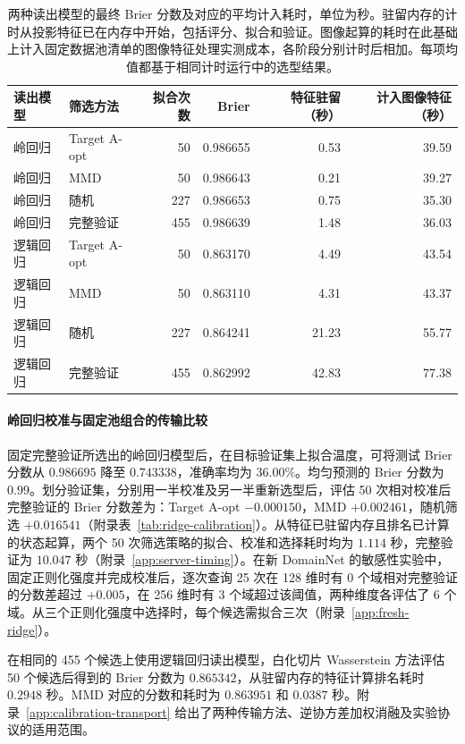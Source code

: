 \documentclass[UTF8,fontset=fandol,scheme=chinese,zihao=false,11pt,letterpaper]{ctexart}
\begin{document}
\begin{table}[ht]
\centering
\caption{两种读出模型的最终 Brier 分数及对应的平均计入耗时，单位为秒。驻留内存的计时从投影特征已在内存中开始，包括评分、拟合和验证。图像起算的耗时在此基础上计入固定数据池清单的图像特征处理实测成本，各阶段分别计时后相加。每项均值都基于相同计时运行中的选型结果。}
\label{tab:cost}
\begin{tabular}{llrrrr}
\toprule
读出模型 & 筛选方法 & 拟合次数 & Brier & 特征驻留（秒） & 计入图像特征（秒）\\
\midrule
岭回归 & Target A-opt & 50 & 0.986655 & 0.53 & 39.59 \\
岭回归 & MMD & 50 & 0.986643 & 0.21 & 39.27 \\
岭回归 & 随机 & 227 & 0.986653 & 0.75 & 35.30 \\
岭回归 & 完整验证 & 455 & 0.986639 & 1.48 & 36.03 \\
逻辑回归 & Target A-opt & 50 & 0.863170 & 4.49 & 43.54 \\
逻辑回归 & MMD & 50 & 0.863110 & 4.31 & 43.37 \\
逻辑回归 & 随机 & 227 & 0.864241 & 21.23 & 55.77 \\
逻辑回归 & 完整验证 & 455 & 0.862992 & 42.83 & 77.38 \\
\bottomrule
\end{tabular}
\end{table}

\paragraph{岭回归校准与固定池组合的传输比较}
固定完整验证所选出的岭回归模型后，在目标验证集上拟合温度，可将测试 Brier 分数从 $0.986695$ 降至 $0.743338$，准确率均为 $36.00\%$。均匀预测的 Brier 分数为 $0.99$。划分验证集，分别用一半校准及另一半重新选型后，评估 50 次相对校准后完整验证的 Brier 分数差为：Target A-opt $-0.000150$，MMD $+0.002461$，随机筛选 $+0.016541$（附录表~\ref{tab:ridge-calibration}）。从特征已驻留内存且排名已计算的状态起算，两个 50 次筛选策略的拟合、校准和选择耗时均为 $1.114$ 秒，完整验证为 $10.047$ 秒（附录~\ref{app:server-timing}）。在新 DomainNet 的敏感性实验中，固定正则化强度并完成校准后，逐次查询 25 次在 128 维时有 0 个域相对完整验证的分数差超过 $+0.005$，在 256 维时有 3 个域超过该阈值，两种维度各评估了 6 个域。从三个正则化强度中选择时，每个候选需拟合三次（附录~\ref{app:fresh-ridge}）。

在相同的 455 个候选上使用逻辑回归读出模型，白化切片 Wasserstein 方法评估 50 个候选后得到的 Brier 分数为 $0.865342$，从驻留内存的特征计算排名耗时 $0.2948$ 秒。MMD 对应的分数和耗时为 $0.863951$ 和 $0.0387$ 秒。附录~\ref{app:calibration-transport} 给出了两种传输方法、逆协方差加权消融及实验协议的适用范围。
\end{document}
